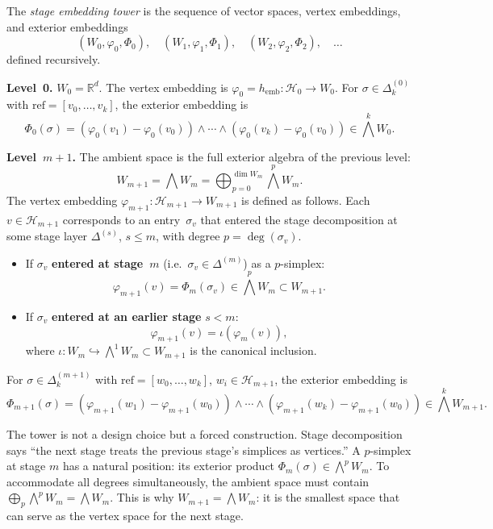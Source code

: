 \begin{definition}\label{def:stage-tower}
The \emph{stage embedding tower} is the sequence of vector spaces, vertex embeddings, and exterior embeddings
\[
  (W_0, \varphi_0, \Phi_0), \quad (W_1, \varphi_1, \Phi_1), \quad (W_2, \varphi_2, \Phi_2), \quad \ldots
\]
defined recursively.

\textbf{Level~0.} $W_0 = \mathbb{R}^d$. The vertex embedding is $\varphi_0 = h_{\mathrm{emb}}: \mathcal{H}_0 \to W_0$. For $\sigma \in \Delta_k^{(0)}$ with $\mathrm{ref} = [v_0, \ldots, v_k]$, the exterior embedding is
\[
  \Phi_0(\sigma) = (\varphi_0(v_1) - \varphi_0(v_0)) \wedge \cdots \wedge (\varphi_0(v_k) - \varphi_0(v_0)) \in \textstyle\bigwedge^k W_0.
\]

\textbf{Level~$m+1$.} The ambient space is the full exterior algebra of the previous level:
\[
  W_{m+1} = \textstyle\bigwedge W_m = \bigoplus_{p=0}^{\dim W_m} \textstyle\bigwedge^p W_m.
\]
The vertex embedding $\varphi_{m+1}: \mathcal{H}_{m+1} \to W_{m+1}$ is defined as follows. Each $v \in \mathcal{H}_{m+1}$ corresponds to an entry~$\sigma_v$ that entered the stage decomposition at some stage layer $\Delta^{(s)}$, $s \leq m$, with degree $p = \deg(\sigma_v)$.
\begin{itemize}
\item If $\sigma_v$ \textbf{entered at stage~$m$} (i.e.\ $\sigma_v \in \Delta^{(m)}$) as a $p$-simplex:
\[
  \varphi_{m+1}(v) = \Phi_m(\sigma_v) \in \textstyle\bigwedge^p W_m \subset W_{m+1}.
\]
\item If $\sigma_v$ \textbf{entered at an earlier stage} $s < m$:
\[
  \varphi_{m+1}(v) = \iota(\varphi_m(v)),
\]
where $\iota: W_m \hookrightarrow \bigwedge^1 W_m \subset W_{m+1}$ is the canonical inclusion.
\end{itemize}
For $\sigma \in \Delta_k^{(m+1)}$ with $\mathrm{ref} = [w_0, \ldots, w_k]$, $w_i \in \mathcal{H}_{m+1}$, the exterior embedding is
\[
  \Phi_{m+1}(\sigma) = (\varphi_{m+1}(w_1) - \varphi_{m+1}(w_0)) \wedge \cdots \wedge (\varphi_{m+1}(w_k) - \varphi_{m+1}(w_0)) \in \textstyle\bigwedge^k W_{m+1}.
\]
\end{definition}

The tower is not a design choice but a forced construction. Stage decomposition says ``the next stage treats the previous stage's simplices as vertices.'' A $p$-simplex at stage $m$ has a natural position: its exterior product $\Phi_m(\sigma) \in \bigwedge^p W_m$. To accommodate all degrees simultaneously, the ambient space must contain $\bigoplus_p \bigwedge^p W_m = \bigwedge W_m$. This is why $W_{m+1} = \bigwedge W_m$: it is the smallest space that can serve as the vertex space for the next stage.

